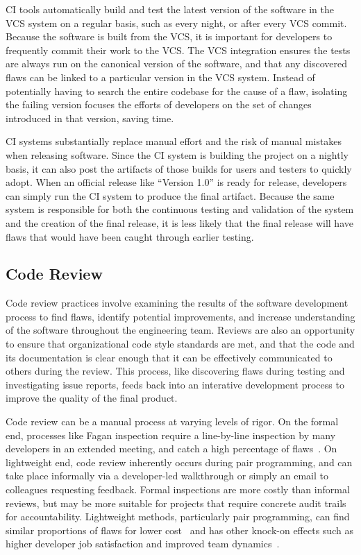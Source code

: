 CI tools automatically build and test the latest version of the
software in the VCS system on a regular basis, such as every night, or
after every VCS commit. Because the software is built from the VCS, it
is important for developers to frequently commit their work to the
VCS. The VCS integration ensures the tests are always run on the
canonical version of the software, and that any discovered flaws can
be linked to a particular version in the VCS system. Instead of
potentially having to search the entire codebase for the cause of a
flaw, isolating the failing version focuses the efforts of developers
on the set of changes introduced in that version, saving time.

CI systems substantially replace manual effort and the risk of manual
mistakes when releasing software. Since the CI system is building the
project on a nightly basis, it can also post the artifacts of those
builds for users and testers to quickly adopt. When an official
release like ``Version 1.0'' is ready for release, developers can
simply run the CI system to produce the final artifact. Because the
same system is responsible for both the continuous testing and
validation of the system and the creation of the final release, it is
less likely that the final release will have flaws that would have
been caught through earlier testing.

\subsection{Code Review}

Code review practices involve examining the results of the software
development process to find flaws, identify potential improvements,
and increase understanding of the software throughout the engineering
team. Reviews are also an opportunity to ensure that organizational
code style standards are met, and that the code and its documentation
is clear enough that it can be effectively communicated to others
during the review. This process, like discovering flaws during
testing and investigating issue reports, feeds back into an interative
development process to improve the quality of the final product.

Code review can be a manual process at varying levels of rigor. On the
formal end, processes like Fagan inspection require a line-by-line
inspection by many developers in an extended meeting, and catch a high
percentage of flaws~\cite{fagan2002design}. On lightweight end, code
review inherently occurs during pair programming, and can take place
informally via a developer-led walkthrough or simply an email to
colleagues requesting feedback. Formal inspections are more costly
than informal reviews, but may be more suitable for projects that
require concrete audit trails for accountability. Lightweight methods,
particularly pair programming, can find similar proportions of flaws
for lower cost~\cite{tomayko2002comparison} and has other knock-on
effects such as higher developer job satisfaction and improved team
dynamics~\cite{cockburn2000costs}.

